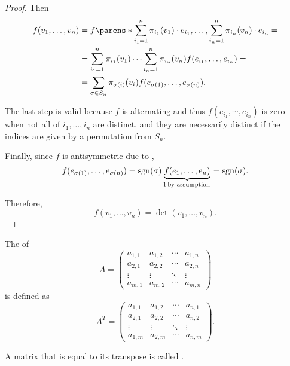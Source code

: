 \begin{proof}
  Then
  \begin{align*}
    f(v_1, \ldots, v_n)
    &=
    f\parens*{ \sum_{i_1=1}^n \pi_{i_1}(v_1) \cdot e_{i_1}, \ldots, \sum_{i_n=1}^n \pi_{i_n}(v_n) \cdot e_{i_n} }
    = \\ &=
    \sum_{i_1=1}^n \pi_{i_1}(v_1) \cdots \sum_{i_n=1}^n \pi_{i_n}(v_n) f(e_{i_1}, \ldots, e_{i_n})
    = \\ &=
    \sum_{\sigma \in S_n} \pi_{\sigma(i)}(v_i) f(e_{\sigma(1)}, \ldots, e_{\sigma(n)}).
  \end{align*}

  The last step is valid because \( f \) is \hyperref[def:alternating_function]{alternating} and thus \( f(e_{i_1}, \cdots, e_{i_n}) \) is zero when not all of \( i_1, \ldots, i_n \) are distinct, and they are necessarily distinct if the indices are given by a permutation from \( S_n \).

  Finally, since \( f \) is \hyperref[def:antisymmetric_function]{antisymmetric} due to ,
  \begin{equation*}
    f(e_{\sigma(1)}, \ldots, e_{\sigma(n)}) = \sgn(\sigma) \underbrace{f(e_1, \ldots, e_n)}_{1 \T*{by assumption}} = \sgn(\sigma).
  \end{equation*}

  Therefore,
  \begin{equation*}
    f(v_1, \ldots, v_n) = \det(v_1, \ldots, v_n).
  \end{equation*}
\end{proof}

\begin{definition}\label{def:transpose_matrix}
  The  of
  \begin{equation*}
    A = \begin{pmatrix}
      a_{1,1} & a_{1,2} & \cdots & a_{1,n} \\
      a_{2,1} & a_{2,2} & \cdots & a_{2,n} \\
      \vdots  & \vdots  & \ddots & \vdots  \\
      a_{m,1} & a_{m,2} & \cdots & a_{m,n}
    \end{pmatrix}
  \end{equation*}
  is defined as
  \begin{equation*}
    A^T = \begin{pmatrix}
      a_{1,1} & a_{1,2} & \cdots & a_{n,1} \\
      a_{2,1} & a_{2,2} & \cdots & a_{n,2} \\
      \vdots  & \vdots  & \ddots & \vdots  \\
      a_{1,m} & a_{2,m} & \cdots & a_{n,m}
    \end{pmatrix}.
  \end{equation*}

  A matrix that is equal to its transpose is called .
\end{definition}

